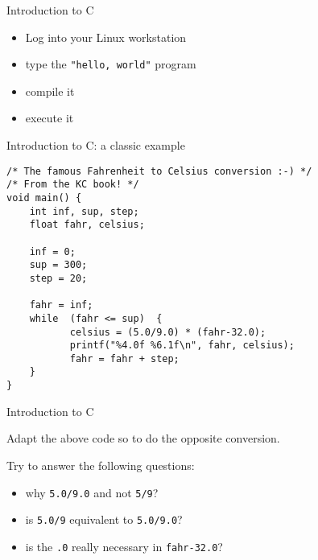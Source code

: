 \begin{frame}[fragile]{Introduction to C}
\begin{itemize}
\item Log into your Linux workstation
\item type the {\tt "hello, world"} program
\item compile it
\item execute it
\end{itemize}



\end{frame}
\begin{frame}[fragile]{Introduction to C: a classic example}
\begin{verbatim}
/* The famous Fahrenheit to Celsius conversion :-) */
/* From the KC book! */
void main() {
    int inf, sup, step;
    float fahr, celsius;

    inf = 0;
    sup = 300;
    step = 20;

    fahr = inf;
    while  (fahr <= sup)  {
           celsius = (5.0/9.0) * (fahr-32.0);
           printf("%4.0f %6.1f\n", fahr, celsius);
           fahr = fahr + step;
    }
}
\end{verbatim}


\end{frame}
\begin{frame}[fragile]{Introduction to C}

Adapt the above code so to do the opposite
conversion.


\vspace{20pt}

Try to answer the following questions:
\begin{itemize}
\item why \verb"5.0/9.0" and not \verb"5/9"?
\item is \verb"5.0/9" equivalent to \verb"5.0/9.0"?
\item is the \verb".0" really necessary in \verb"fahr-32.0"?
\end{itemize}


\end{frame}
